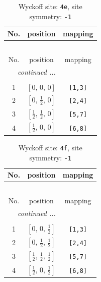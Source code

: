 \documentclass[fleqn,8pt]{jsarticle}
\begin{document}
\begin{longtable}{ccc}
\caption{Wyckoff site: {\tt 4e}, site symmetry: {\tt -1}}
 \\
 \hline \hline
No. & position & mapping \\ \hline \endfirsthead

\multicolumn{2}{l}{\tablename\ \thetable{}} \\
 \hline \hline
No. & position & mapping \\ \hline \endhead

 \hline \hline
\multicolumn{2}{r}{\footnotesize\it continued ...} \\ \endfoot

 \hline \hline
\multicolumn{2}{r}{} \\ \endlastfoot

1 & $\left[ 0,\, 0,\, 0 \right]$ & {\tt [1,3]} \\ \hline
2 & $\left[ 0,\, \frac{1}{2},\, 0 \right]$ & {\tt [2,4]} \\ \hline
3 & $\left[ \frac{1}{2},\, \frac{1}{2},\, 0 \right]$ & {\tt [5,7]} \\ \hline
4 & $\left[ \frac{1}{2},\, 0,\, 0 \right]$ & {\tt [6,8]} \\
\end{longtable}
\renewcommand{\arraystretch}{1.2}
\begin{longtable}{ccc}
\caption{Wyckoff site: {\tt 4f}, site symmetry: {\tt -1}}
 \\
 \hline \hline
No. & position & mapping \\ \hline \endfirsthead

\multicolumn{2}{l}{\tablename\ \thetable{}} \\
 \hline \hline
No. & position & mapping \\ \hline \endhead

 \hline \hline
\multicolumn{2}{r}{\footnotesize\it continued ...} \\ \endfoot

 \hline \hline
\multicolumn{2}{r}{} \\ \endlastfoot

1 & $\left[ 0,\, 0,\, \frac{1}{2} \right]$ & {\tt [1,3]} \\ \hline
2 & $\left[ 0,\, \frac{1}{2},\, \frac{1}{2} \right]$ & {\tt [2,4]} \\ \hline
3 & $\left[ \frac{1}{2},\, \frac{1}{2},\, \frac{1}{2} \right]$ & {\tt [5,7]} \\ \hline
4 & $\left[ \frac{1}{2},\, 0,\, \frac{1}{2} \right]$ & {\tt [6,8]} \\
\end{longtable}
\end{document}
